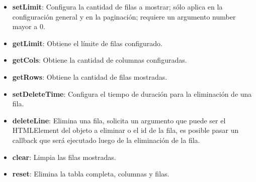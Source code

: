 \documentclass[10pt]{article}
\begin{document}
\begin{itemize}
	\item \textbf{setLimit}: Configura la cantidad de filas a mostrar; sólo aplica en la configuración general y en la paginación; requiere un argumento number mayor a 0.

	\item \textbf{getLimit}: Obtiene el límite de filas configurado.
	
	\item \textbf{getCols}: Obtiene la cantidad de columnas configuradas.
	
	\item \textbf{getRows}: Obtiene la cantidad de filas mostradas.

	\item \textbf{setDeleteTime}: Configura el tiempo de duración para la eliminación de una fila.
	
	\item \textbf{deleteLine}: Elimina una fila, solicita un argumento que puede ser el HTMLElement del objeto a eliminar o el id de la fila, es posible pasar un callback que será ejecutado luego de la eliminación de la fila.
	
	\item \textbf{clear}: Limpia las filas mostradas.
	
	\item \textbf{reset}: Elimina la tabla completa, columnas y filas.
\end{itemize}
\end{document}
